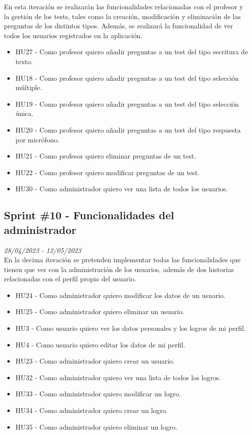 En esta iteración se realizarán las funcionalidades relacionadas con el profesor y la gestión de los tests, tales como la creación, modificación y eliminación de las preguntas
de los distintos tipos. Además, se realizará la funcionalidad de ver todos los usuarios registrados en la aplicación.


\begin{itemize}
    \item HU27 - Como profesor quiero añadir preguntas a un test del tipo escritura de texto.
    \item HU18 - Como profesor quiero añadir preguntas a un test del tipo selección múltiple.
    \item HU19 - Como profesor quiero añadir preguntas a un test del tipo selección única.
    \item HU20 - Como profesor quiero añadir preguntas a un test del tipo respuesta por micrófono.
    \item HU21 - Como profesor quiero eliminar preguntas de un test.
    \item HU22 - Como profesor quiero modificar preguntas de un test.
    \item HU30 - Como administrador quiero ver una lista de todos los usuarios.
\end{itemize}


\subsection{Sprint \#10 - Funcionalidades del administrador}
\textit{28/04/2023   -   12/05/2023}\\

En la decima iteración se pretenden implementar todas las funcionalidades que tienen que ver con la administración de los usuarios, además de
dos historias relacionadas con el perfil propio del usuario.
\begin{itemize}
    \item HU24 - Como administrador quiero modificar los datos de un usuario.
    \item HU25 - Como administrador quiero eliminar un usuario.
    \item HU3 - Como usuario quiero ver los datos personales y los logros de mi perfil.
    \item HU4 - Como usuario quiero editar los datos de mi perfil.
    \item HU23 - Como administrador quiero crear un usuario.
    \item HU32 - Como administrador quiero ver una lista de todos los logros. 
    \item HU33 - Como administrador quiero modificar un logro.
    \item HU34 - Como administrador quiero crear un logro.
    \item HU35 - Como administrador quiero eliminar un logro.
\end{itemize}

